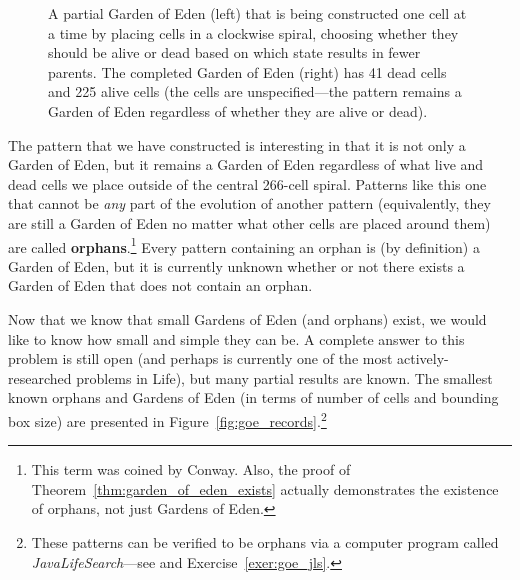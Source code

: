 \begin{figure}[!htb]
	\centering{}
	
	\caption{A partial Garden of Eden (left) that is being constructed one cell at a time by placing cells in a clockwise spiral, choosing whether they should be alive or dead based on which state results in fewer parents. The completed Garden of Eden (right) has 41 dead cells and 225 alive cells (the  cells are unspecified---the pattern remains a Garden of Eden regardless of whether they are alive or dead).}\label{fig:goe_1}
\end{figure}

The pattern that we have constructed is interesting in that it is not only a Garden of Eden, but it remains a Garden of Eden regardless of what live and dead cells we place outside of the central 266-cell spiral. Patterns like this one that cannot be \emph{any} part of the evolution of another pattern (equivalently, they are still a Garden of Eden no matter what other cells are placed around them) are called \textbf{orphans}.\footnote{This term was coined by Conway. Also, the proof of Theorem~\ref{thm:garden_of_eden_exists} actually demonstrates the existence of orphans, not just Gardens of Eden.} Every pattern containing an orphan is (by definition) a Garden of Eden, but it is currently unknown whether or not there exists a Garden of Eden that does not contain an orphan.

Now that we know that small Gardens of Eden (and orphans) exist, we would like to know how small and simple they can be. A complete answer to this problem is still open (and perhaps is currently one of the most actively-researched problems in Life), but many partial results are known. The smallest known orphans and Gardens of Eden (in terms of number of cells and bounding box size) are presented in Figure~\ref{fig:goe_records}.\footnote{These patterns can be verified to be orphans via a computer program called \emph{JavaLifeSearch}---see  and Exercise~\ref{exer:goe_jls}.}

